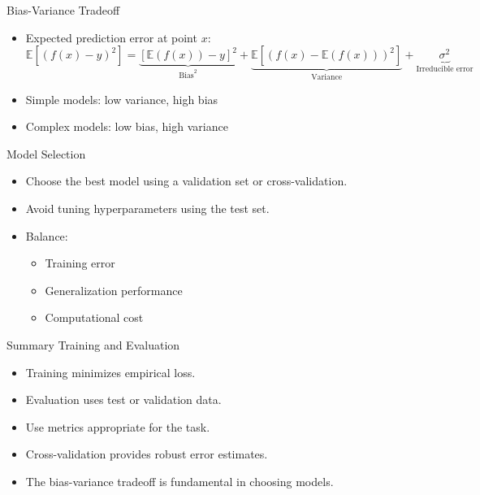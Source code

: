 \documentclass[aspectratio=169]{beamer}
\begin{document}
\begin{frame}[label={sec:org2c6b2ca}]{Bias-Variance Tradeoff}
\begin{itemize}
\item Expected prediction error at point \(x\):
\[
  \mathbb{E}[(f(x) - y)^2] = \underbrace{[\mathbb{E}(f(x)) - y]^2}_{\text{Bias}^2} + \underbrace{\mathbb{E}[(f(x) - \mathbb{E}(f(x)))^2]}_{\text{Variance}} + \underbrace{\sigma^2}_{\text{Irreducible error}}
  \]
\item Simple models: low variance, high bias
\item Complex models: low bias, high variance
\end{itemize}
\end{frame}

\begin{frame}[label={sec:org33c1634}]{Model Selection}
\begin{itemize}
\item Choose the best model using a \alert{validation set} or \alert{cross-validation}.
\item Avoid tuning hyperparameters using the test set.
\item Balance:
\begin{itemize}
\item Training error
\item Generalization performance
\item Computational cost
\end{itemize}
\end{itemize}
\end{frame}

\begin{frame}[label={sec:orgf655c04}]{Summary Training and Evaluation}
\begin{itemize}
\item Training minimizes empirical loss.
\item Evaluation uses test or validation data.
\item Use metrics appropriate for the task.
\item Cross-validation provides robust error estimates.
\item The bias-variance tradeoff is fundamental in choosing models.
\end{itemize}
\end{frame}
\end{document}
